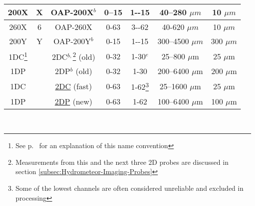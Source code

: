 \begin{center}
\begin{minipage}[t]{1\columnwidth}
\begin{center}
\begin{tabular}{|c|c|c|c|c|c|c|}
\hline 
{\small{}200X} & {\small{}X} & OAP-200X{\small{}$^{b}$} & {\small{}0--15} & {\small{}1-{}-15} & {\small{}40--280 $\mu m$} & {\small{}10 $\mu m$}\tabularnewline
\hline 
{\small{}260X} & {\small{}6} & OAP-260X & {\small{}0-63} & {\small{}3-{}-62} & {\small{}40-620 $\mu m$} & {\small{}10 $\mu m$}\tabularnewline
\hline 
{\small{}200Y} & {\small{}Y} & {\small{}OAP-200Y$^{b}$} & {\small{}0-15} & {\small{}1-{}-15} & {\small{}300--4500 $\mu m$} & {\small{}300 $\mu m$}\tabularnewline
\hline 
1DC\footnote{See p.~\pageref{Despite-the-'1D'} for an explanation of this name
convention}  &  & 2DC$^{b,}$\footnote{Measurements from this and the next three 2D probes are discussed
in section \vref{subsec:Hydrometeor-Imaging-Probes}} (old) & 0-32 & 1-30$^{e}$ & 25--800 $\mu$m  & 25 $\mu$m\tabularnewline
\hline 
1DP &  & 2DP$^{b}$ (old) & 0-32 & 1-30 & 200--6400 $\mu$m & 200 $\mu$m\tabularnewline
\hline 
1DC  &  & \href{https://www.eol.ucar.edu/instruments/two-dimensional-optical-array-cloud-probe}{2DC}
(fast) & 0-63 & 1-62\footnote{Some of the lowest channels are often considered unreliable and excluded
in processing} & 25--1600 $\mu$m & 25 $\mu$m\tabularnewline
\hline 
1DP &  & \href{https://www.eol.ucar.edu/instruments/two-dimensional-optical-array-precipitation-probe}{2DP}
(new) & 0-63 & 1-62 & 100--6400 $\mu$m & 100 $\mu$m\tabularnewline
\hline 
\end{tabular}
\par\end{center}%
\end{minipage}\\
\par\end{center}
